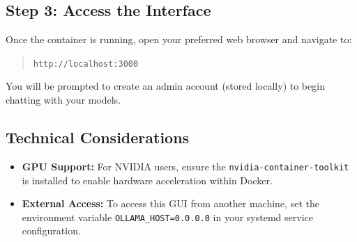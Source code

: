\subsection{Step 3: Access the Interface}
Once the container is running, open your preferred web browser and navigate to:
\begin{quote}
    \texttt{http://localhost:3000}
\end{quote}
You will be prompted to create an admin account (stored locally) to begin chatting with your models.

\subsection{Technical Considerations}
\begin{itemize}
    \item \textbf{GPU Support:} For NVIDIA users, ensure the \texttt{nvidia-container-toolkit} is installed to enable hardware acceleration within Docker.
    \item \textbf{External Access:} To access this GUI from another machine, set the environment variable \texttt{OLLAMA\_HOST=0.0.0.0} in your systemd service configuration.
\end{itemize}

